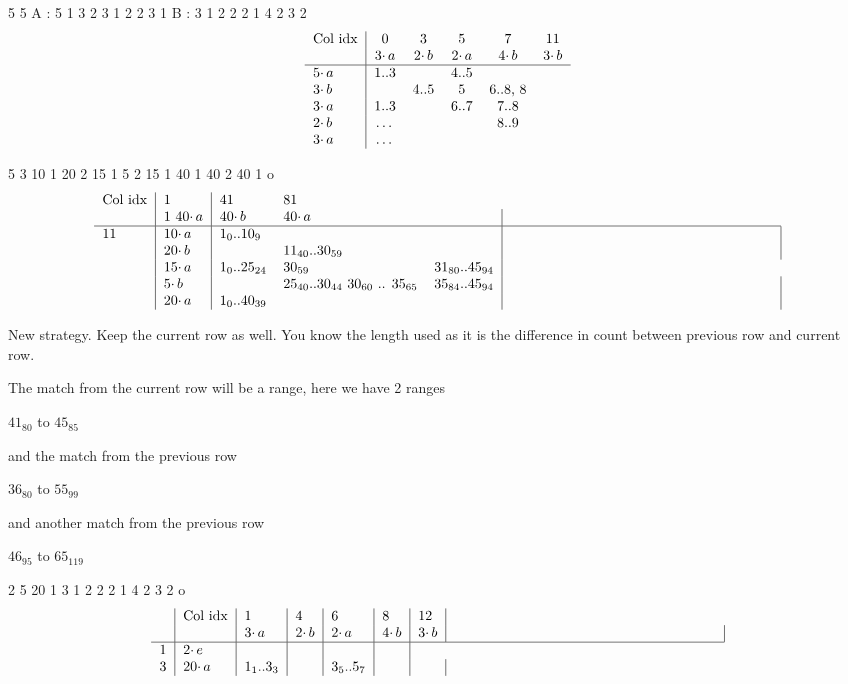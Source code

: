 \documentclass{article}
\begin{document}
5 5 
A : 5 1  3 2   3 1   2 2   3 1
B : 3 1  2 2   2 1   4 2   3 2
\newline 
\[  \begin{tabular} {l | *{10}{c}}
Col idx & 0 & 3 & 5 & 7 & 11  \\
& $3 \cdotp a$ & $2 \cdotp b$ & $2 \cdotp a$ & $4 \cdotp b$ & $3 \cdotp b$  \\
\hline 
$5 \cdotp a$  & 1..3  &     & 4..5  &    \\
$3 \cdotp b$  &       & 4..5 &  5   & 6..8, 8 \\
$3 \cdotp a$  & 1..3  &     & 6..7 & 7..8 \\
$2 \cdotp b$  & \dots  &     &      & 8..9   \\
$3 \cdotp a$  & \dots  &     &      &    \\
\end{tabular} \]


5 3
10 1   20 2    15 1    5 2   15 1
40 1   40 2    40 1 
o
\newline 
\[ \begin{tabular} {l | l | *{3}{l} | p{66mm} | }
Col idx & 1 & 41 & 81   \\
& 1 $40 \cdotp a$ & $40 \cdotp b$ & $40 \cdotp a$ &   \\
\hline 
11 & $10 \cdotp a$  & $1_{0}$..$10_{9}$  &     &   &    \\
 & $20 \cdotp b$  &       & $11_{40}$..$30_{59}$ &     &  \\
& $15 \cdotp a$  & $1_{0}$..$25_{24}$  & $30_{59}$  & $31_{80}$..$45_{94}$ \\
& $5 \cdotp b$  &  & $25_{40}$..$30_{44}$  $30_{60}$ .. $35_{65}$ &  $35_{84}$..$45_{94}$    &   \\
& $20 \cdotp a$  & $1_{0}$..$40_{39}$   &     &      &    \\
\end{tabular} \]


New strategy.  Keep the current row as well.  You know the length used as it is 
the difference in count between previous row and current row.

The match from the current row will be a range, here we have 2 ranges

$41_{80}$ to $45_{85}$

and the match from the previous row

$36_{80}$ to $55_{99}$

and another match from the previous row

$46_{95}$  to $65_{119}$

2 5    20 1
3 1    2 2   2 1   4 2   3 2
o
\newline 
\[ \begin{tabular} {l | l | *{5}{l|} p{66mm} | }
& Col idx & 1 & 4 & 6 & 8 & 12   \\
 & & $3 \cdotp a$ & $2 \cdotp b$ & $2 \cdotp a$ & $4 \cdotp b$ & $3 \cdotp b$ &    \\
\hline 
1 & $2 \cdotp e$  &   &     &   &    \\
3 & $20 \cdotp a$ & $1_{1}$..$3_{3}$ &       & $3_{5}$..$5_{7}$ &     &  \\
\end{tabular} \]
\end{document}
